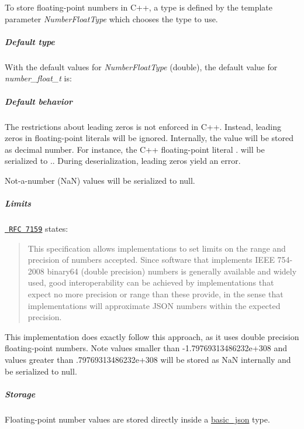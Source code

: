 To store floating-\/point numbers in C++, a type is defined by the template parameter {\itshape Number\+Float\+Type} which chooses the type to use.

\subparagraph*{Default type}

With the default values for {\itshape Number\+Float\+Type} ({\ttfamily double}), the default value for {\itshape number\+\_\+float\+\_\+t} is\+:


\begin{DoxyCode}{0}
\DoxyCodeLine{\textcolor{keywordtype}{double}}
\end{DoxyCode}


\subparagraph*{Default behavior}


\begin{DoxyItemize}
\item The restrictions about leading zeros is not enforced in C++. Instead, leading zeros in floating-\/point literals will be ignored. Internally, the value will be stored as decimal number. For instance, the C++ floating-\/point literal {.} will be serialized to {.}. During deserialization, leading zeros yield an error.
\item Not-\/a-\/number (NaN) values will be serialized to {\ttfamily null}.
\end{DoxyItemize}

\subparagraph*{Limits}

\href{http://rfc7159.net/rfc7159}{\texttt{ R\+FC 7159}} states\+: \begin{quote}
This specification allows implementations to set limits on the range and precision of numbers accepted. Since software that implements I\+E\+EE 754-\/2008 binary64 (double precision) numbers is generally available and widely used, good interoperability can be achieved by implementations that expect no more precision or range than these provide, in the sense that implementations will approximate J\+S\+ON numbers within the expected precision. \end{quote}


This implementation does exactly follow this approach, as it uses double precision floating-\/point numbers. Note values smaller than {\ttfamily -\/1.\+79769313486232e+308} and values greater than {.\+79769313486232e+308} will be stored as NaN internally and be serialized to {\ttfamily null}.

\subparagraph*{Storage}

Floating-\/point number values are stored directly inside a \mbox{\hyperlink{classnlohmann_1_1basic__json}{basic\+\_\+json}} type.

